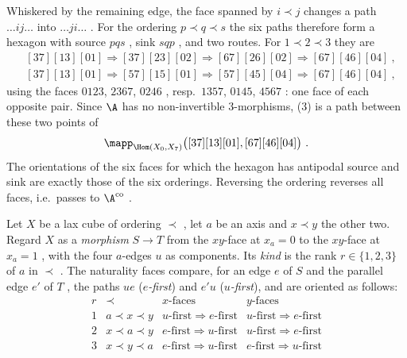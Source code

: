 \begin{rmk}
\label{rmk:lax-cube-hexagon}
%
Whiskered by the remaining edge, the face spanned by $i \prec j$ changes a path
$\dots ij \dots$ into $\dots ji \dots$ .
For the ordering $p \prec q \prec s$ the six paths therefore form a hexagon with
source $pqs$ , sink $sqp$ , and two routes. For $1 \prec 2 \prec 3$ they are
\begin{align*}
&[37][13][01] \Rightarrow [37][23][02] \Rightarrow [67][26][02] \Rightarrow
[67][46][04] \ , \\
&[37][13][01] \Rightarrow [57][15][01] \Rightarrow [57][45][04] \Rightarrow
[67][46][04] \ ,
\end{align*}
using the faces $0123$, $2367$, $0246$ , resp.\ $1357$, $0145$, $4567$ :
one face of each opposite pair. Since $\A$ has no non-invertible $3$-morphisms,
(3) is a path between these two points of
\begin{equation*}
\mapp_{\Hom(X_{0},X_{7})}\bigl([37][13][01],[67][46][04]\bigr) \ .
\end{equation*}
The orientations of the six faces for which the hexagon has antipodal source and
sink are exactly those of the six orderings.
Reversing the ordering reverses all faces, i.e.\ passes to $\A^{\mathrm{co}}$ .
\end{rmk}

\begin{defi}
\label{def:lax-cube-kind}
%
Let $X$ be a lax cube of ordering $\prec$ ,
let $a$ be an axis and $x \prec y$ the other two.
Regard $X$ as a \emph{morphism} $S \to T$ from the $xy$-face at $x_{a} = 0$ to
the $xy$-face at $x_{a} = 1$ , with the four $a$-edges $u$ as components.
Its \emph{kind} is the rank $r \in \{1,2,3\}$ of $a$ in $\prec$ .
The naturality faces compare, for an edge $e$ of $S$ and the parallel edge $e'$
of $T$ , the paths $ue$ (\emph{$e$-first}) and $e'u$ (\emph{$u$-first}),
and are oriented as follows:
\begin{equation*}
\begin{array}{llll}
r & \prec & \text{$x$-faces} & \text{$y$-faces} \\ \hline
1 & a \prec x \prec y & \text{$u$-first} \Rightarrow \text{$e$-first} &
\text{$u$-first} \Rightarrow \text{$e$-first} \\
2 & x \prec a \prec y & \text{$e$-first} \Rightarrow \text{$u$-first} &
\text{$u$-first} \Rightarrow \text{$e$-first} \\
3 & x \prec y \prec a & \text{$e$-first} \Rightarrow \text{$u$-first} &
\text{$e$-first} \Rightarrow \text{$u$-first}
\end{array}
\end{equation*}
\end{defi}

